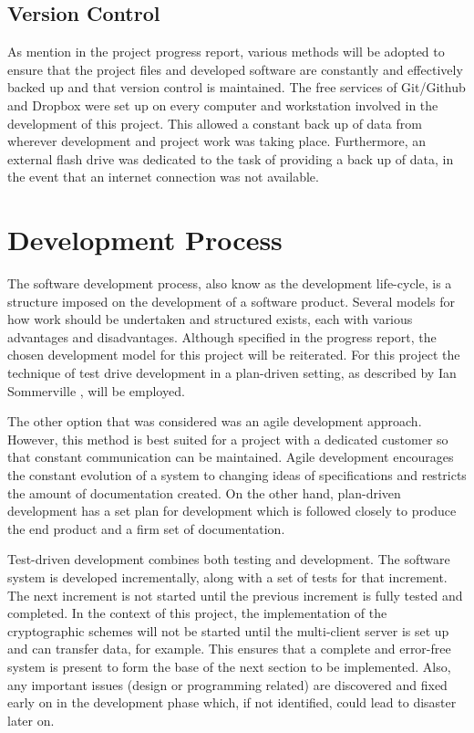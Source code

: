 \documentclass[a4paper,12pt]{report}
\begin{document}
\subsection{Version Control}

As mention in the project progress report, various methods will be adopted to ensure that the project files and developed software are constantly and effectively backed up and that version control is maintained. The free services of Git/Github \cite{github} and Dropbox \cite{dropbox} were set up on every computer and workstation involved in the development of this project. This allowed a constant back up of data from wherever development and project work was taking place. Furthermore, an external flash drive was dedicated to the task of providing a back up of data, in the event that an internet connection was not available. 

\section{Development Process}

The software development process, also know as the development life-cycle, is a structure imposed on the development of a software product. Several models for how work should be undertaken and structured exists, each with various advantages and disadvantages. Although specified in the progress report, the chosen development model for this project will be reiterated. For this project the technique of test drive development in a plan-driven setting, as described by Ian Sommerville \cite{iansommerville}, will be employed. 

The other option that was considered was an agile development approach. However, this method is best suited for a project with a dedicated customer so that constant communication can be maintained. Agile development encourages the constant evolution of a system to changing ideas of specifications and restricts the amount of documentation created. On the other hand, plan-driven development has a set plan for development which is followed closely to produce the end product and a firm set of documentation. 

Test-driven development combines both testing and development. The software system is developed incrementally, along with a set of tests for that increment. The next increment is not started until the previous increment is fully tested and completed. In the context of this project, the implementation of the cryptographic schemes will not be started until the multi-client server is set up and can transfer data, for example. This ensures that a complete and error-free system is present to form the base of the next section to be implemented. Also, any important issues (design or programming related) are discovered and fixed early on in the development phase which, if not identified, could lead to disaster later on. 
\end{document}
